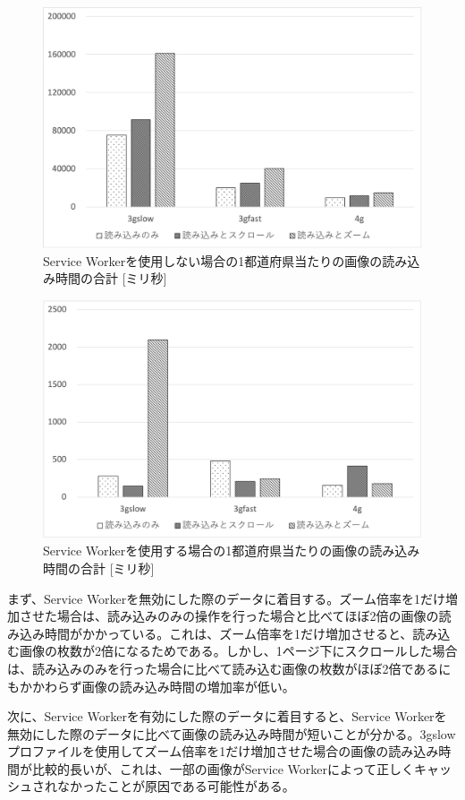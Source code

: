 \begin{figure}
  \centering
  \includegraphics[width=\textwidth]{paper/images/sum_of_image_durations_without_service_worker.png}
  \caption{Service Workerを使用しない場合の1都道府県当たりの画像の読み込み時間の合計 [ミリ秒]}\label{figure:Service Workerを使用しない場合の1都道府県当たりの画像の読み込み時間の合計}
\end{figure}

\begin{figure}
  \centering
  \includegraphics[width=\textwidth]{paper/images/sum_of_image_durations_with_service_worker.png}
  \caption{Service Workerを使用する場合の1都道府県当たりの画像の読み込み時間の合計 [ミリ秒]}\label{figure:Service Workerを使用する場合の1都道府県当たりの画像の読み込み時間の合計}
\end{figure}

まず、Service Workerを無効にした際のデータに着目する。ズーム倍率を1だけ増加させた場合は、読み込みのみの操作を行った場合と比べてほぼ2倍の画像の読み込み時間がかかっている。これは、ズーム倍率を1だけ増加させると、読み込む画像の枚数が2倍になるためである。しかし、1ページ下にスクロールした場合は、読み込みのみを行った場合に比べて読み込む画像の枚数がほぼ2倍であるにもかかわらず画像の読み込み時間の増加率が低い。

次に、Service Workerを有効にした際のデータに着目すると、Service Workerを無効にした際のデータに比べて画像の読み込み時間が短いことが分かる。3gslowプロファイルを使用してズーム倍率を1だけ増加させた場合の画像の読み込み時間が比較的長いが、これは、一部の画像がService Workerによって正しくキャッシュされなかったことが原因である可能性がある。